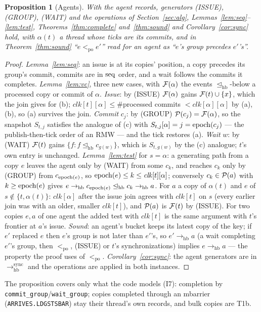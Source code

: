 \documentclass[11pt]{article}
\newtheorem{proposition}[theorem]{Proposition}
\theoremstyle{remark}
\newcommand{\PO}{<_{\mathrm{po}}}\newcommand{\HB}{\to_{\mathrm{hb}}}\newcommand{\HBr}{\trianglelefteq_{\mathrm{hb}}}
\newcommand{\clk}{\mathit{clk}}\newcommand{\Bk}{B}\newcommand{\Ch}{\mathit{Ch}}\newcommand{\lastr}{\mathit{last}}
\begin{document}
\begin{proposition}[Agents]\label{prop:agents}
With the agent records, generators (ISSUE), (GROUP), (WAIT) and the operations of
Section~\ref{sec:alg}, Lemmas~\ref{lem:seq}--\ref{lem:test}, Theorems~\ref{thm:complete}
and~\ref{thm:sound} and Corollary~\ref{cor:sync} hold, with $\alpha(t)$ a thread whose
ticks are its commits, and in Theorem~\ref{thm:sound} ``$e\PO e'$'' read for an agent as
``$e$'s group precedes $e'$'s''.
\end{proposition}
\begin{proof}
\emph{Lemma~\ref{lem:seq}}: an issue is at its copies' position, a copy precedes its
group's commit, commits are in $\operatorname{seq}$ order, and a wait follows the commits it completes.
\emph{Lemma~\ref{lem:vc}}, three new cases, with $\mathcal{F}(\alpha)$ the events $\HBr$-below a
processed copy or commit of $\alpha$. \emph{Issue}: by (ISSUE) $\mathcal{F}(\alpha)$ gains
$\mathcal{F}(t)\cup\{x\}$, which the join gives for (b); $\clk[t][\alpha]\le\#$processed commits
$<\clk[\alpha][\alpha]$ by (a),(b), so (a) survives the join. \emph{Commit} $c_j$: by
(GROUP) $\mathcal{P}(c_j)=\mathcal{F}(\alpha)$, so the snapshot $S_{t,j}$ satisfies the analogue of (c) with
$S_{t,j}[\alpha]=j=\operatorname{epoch}(c_j)$ --- the publish-then-tick order of an RMW --- and the tick
restores (a). \emph{Wait} $w$: by (WAIT) $\mathcal{F}(t)$ gains $\{f:f\HBr c_{g(w)}\}$, which is
$S_{t,g(w)}$ by the (c) analogue; $t$'s own entry is unchanged. \emph{Lemma~\ref{lem:test}}
for $s=\alpha$: a generating path from a copy $e$ leaves the agent only by (WAIT) from some
$c_k$, and reaches $c_k$ only by (GROUP) from $c_{\operatorname{epoch}(e)}$, so $\epoch(e)\le k\le\clk[t][\alpha]$;
conversely $c_k\in\mathcal{P}(a)$ with $k\ge\operatorname{epoch}(e)$ gives $e\HB c_{\epoch(e)}\HBr c_k\HB a$. For
$a$ a copy of $\alpha(t)$ and $e$ of $s\notin\{t,\alpha(t)\}$: $\clk[\alpha]$ after the issue
join agrees with $\clk[t]$ on $s$ (every earlier join was with an older, smaller $\clk[t]$),
and $\mathcal{P}(a)$ is $\mathcal{F}(t)$ by (ISSUE). For two copies $e,a$ of one agent the added test with
$\clk[t]$ is the same argument with $t$'s frontier at $a$'s issue. \emph{Sound}: an agent's
bucket keeps its latest copy of the key; if $e'$ replaced $e$ then $e$'s group is not later
than $e'$'s, so $e'\HB a$ (a wait completing $e'$'s group, then $\PO$, (ISSUE) or $t$'s
synchronizations) implies $e\HB a$ --- the property the proof uses of $\PO$.
\emph{Corollary~\ref{cor:sync}}: the agent generators are in $\HB^{\mathrm{sync}}$ and the
operations are applied in both instances.
\end{proof}
\noindent The proposition covers only what the code models (I7): completion by
\texttt{commit\_group}/\texttt{wait\_group}; copies completed through an mbarrier
(\texttt{ARRIVES.LDGSTSBAR}) stay their thread's own records, and bulk copies are T1b.
\end{document}
